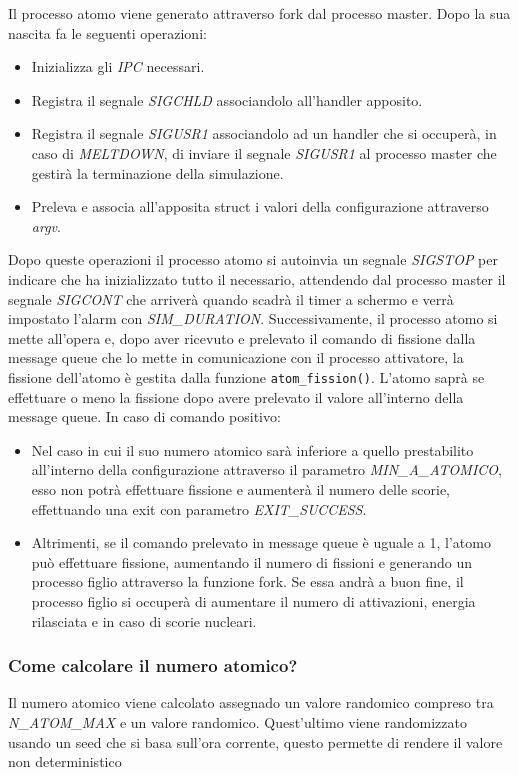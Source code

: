 Il processo atomo viene generato attraverso fork dal processo master. Dopo la sua nascita fa le seguenti operazioni:
\begin{itemize}
    \item Inizializza gli \textit{IPC} necessari.
    \item Registra il segnale \textit{SIGCHLD} associandolo all'handler apposito. 
    \item Registra il segnale \textit{SIGUSR1} associandolo ad un handler che si occuperà, in caso di \textit{MELTDOWN}, di inviare il segnale \textit{SIGUSR1} al processo master che gestirà la terminazione della simulazione. 
    \item Preleva e associa all'apposita struct i valori della configurazione attraverso \textit{argv}. 
\end{itemize}
Dopo queste operazioni il processo atomo si autoinvia un segnale \textit{SIGSTOP} per indicare che ha inizializzato tutto il necessario, attendendo dal processo master il segnale \textit{SIGCONT} che arriverà quando scadrà il timer a schermo e verrà impostato l'alarm con \textit{SIM\_DURATION}. Successivamente, il processo atomo si mette all'opera e, dopo aver ricevuto e prelevato il comando di fissione dalla message queue che lo mette in comunicazione con il processo attivatore, la fissione dell'atomo è gestita dalla funzione \lstinline{atom_fission()}. L'atomo saprà se effettuare o meno la fissione dopo avere prelevato il valore all'interno della message queue. In caso di comando positivo:
\begin{itemize}
    \item Nel caso in cui il suo numero atomico sarà inferiore a quello prestabilito all'interno della configurazione attraverso il parametro \textit{MIN\_A\_ATOMICO}, esso non potrà effettuare fissione e aumenterà il numero delle scorie, effettuando una exit con parametro \textit{EXIT\_SUCCESS}.
    \item Altrimenti, se il comando prelevato in message queue è uguale a 1, l'atomo può effettuare fissione, aumentando il numero di fissioni e generando un processo figlio attraverso la funzione fork. Se essa andrà a buon fine, il processo figlio si occuperà di aumentare il numero di attivazioni, energia rilasciata e in caso di scorie nucleari.
\end{itemize}
\subsubsection{Come calcolare il numero atomico?}
Il numero atomico viene calcolato assegnado un valore randomico compreso tra \textit{N\_ATOM\_MAX} e un valore randomico.
Quest'ultimo viene randomizzato usando un seed che si basa sull'ora corrente, questo permette di rendere il valore non deterministico
